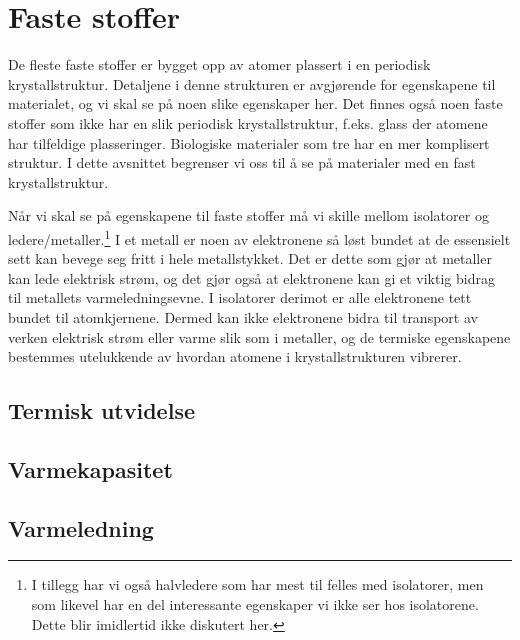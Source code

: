 \chapter{Faste stoffer}
De fleste faste stoffer er bygget opp av atomer plassert i en periodisk krystallstruktur. Detaljene i denne strukturen er avgjørende for egenskapene til materialet, og vi skal se på noen slike egenskaper her. Det finnes også noen faste stoffer som ikke har en slik periodisk krystallstruktur, f.eks. glass der atomene har tilfeldige plasseringer. Biologiske materialer som tre har en mer komplisert struktur. I dette avsnittet begrenser vi oss til å se på materialer med en fast krystallstruktur.

Når vi skal se på egenskapene til faste stoffer må vi skille mellom isolatorer og ledere/metaller.\footnote{I tillegg har vi også halvledere som har mest til felles med isolatorer, men som likevel har en del interessante egenskaper vi ikke ser hos isolatorene. Dette blir imidlertid ikke diskutert her.} I et metall er noen av elektronene så løst bundet at de essensielt sett kan bevege seg fritt i hele metallstykket. Det er dette som gjør at metaller kan lede elektrisk strøm, og det gjør også at elektronene kan gi et viktig bidrag til metallets varmeledningsevne. I isolatorer derimot er alle elektronene tett bundet til atomkjernene. Dermed kan ikke elektronene bidra til transport av verken elektrisk strøm eller varme slik som i metaller, og de termiske egenskapene bestemmes utelukkende av hvordan atomene i krystallstrukturen vibrerer.

\section{Termisk utvidelse}

\section{Varmekapasitet}

\section{Varmeledning}